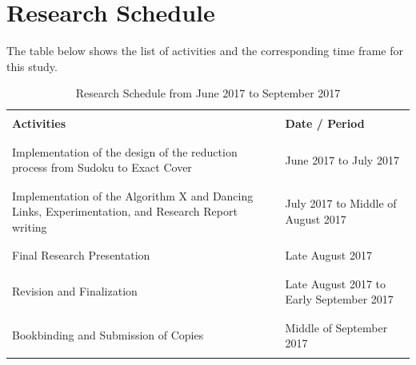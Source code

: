 \documentclass[a4paper,oneside,11pt]{report}
\begin{document}
\chapter{Research Schedule}
The table below shows the list of activities and the corresponding time frame for this study.
\begin{table}[!ht]
\begin{center}
\begin{tabular}{p{3.75in} | p{2in}}
\hline
&\\
\textbf{Activities} & \textbf{Date / Period}\\
&\\
\hline
\hline
&\\
Implementation of the design of the reduction process from Sudoku to Exact Cover & June 2017 to July 2017\\
&\\
\hline
&\\
Implementation of the Algorithm X and Dancing Links, Experimentation, and Research Report writing & July 2017 to Middle of August 2017\\
&\\
\hline
&\\
Final Research Presentation & Late August 2017\\
&\\
\hline
&\\
Revision and Finalization & Late August 2017 to Early September 2017\\
&\\
\hline
&\\
Bookbinding and Submission of Copies & Middle of September 2017\\
&\\
\hline
\end{tabular}
\end{center}
\caption{Research Schedule from June 2017 to September 2017}
\end{table}

\nocite{*}

\end{document}
